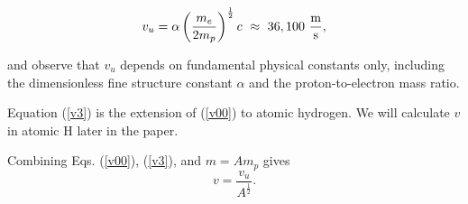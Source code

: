 \documentclass[aps,prl,groupedaddress,fleqn,twocolumn,10pt]{revtex4-1}
\begin{document}
\begin{equation}
v_u=\alpha\left(\frac{m_e}{2m_p}\right)^{\frac{1}{2}}c~\approx~36,100~\frac{\rm m}{\rm s},
\label{v3}
\end{equation}

\noindent and observe that $v_u$ depends on fundamental physical constants only, including the dimensionless fine structure constant $\alpha$ and the proton-to-electron mass ratio.

Equation (\ref{v3}) is the extension of (\ref{v00}) to atomic hydrogen. We will calculate $v$ in atomic H later in the paper.

Combining Eqs. (\ref{v00}), (\ref{v3}), and $m=Am_p$ gives
\begin{equation}
v=\frac{v_u}{A^\frac{1}{2}}.
\label{a}
\end{equation}
\end{document}
